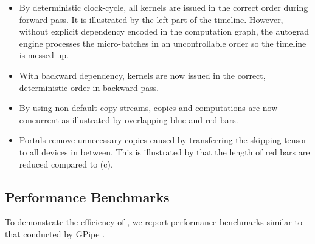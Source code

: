 \begin{itemize}
    \item[(a)] By deterministic clock-cycle, all kernels are issued in the correct order during forward pass. It is illustrated by the left part of the timeline. However, without explicit dependency encoded in the computation graph, the autograd engine processes the micro-batches in an uncontrollable order so the timeline is messed up.
    \item[(b)] With backward dependency, kernels are now issued in the correct, deterministic order in backward pass.
    \item[(c)] By using non-default copy streams, copies and computations are now concurrent as illustrated by overlapping blue and red bars.
    \item[(d)] Portals remove unnecessary copies caused by transferring the skipping tensor to all devices in between. This is illustrated by that the length of red bars are reduced compared to (c). 
\end{itemize}


\subsection{Performance Benchmarks}

To demonstrate the efficiency of {\torchgpipe}, we report performance benchmarks similar to that conducted by GPipe \cite{huang2019gpipe}. 



